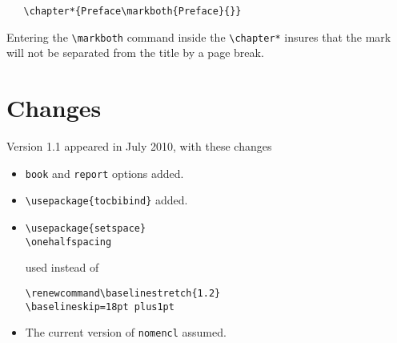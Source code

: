 \documentclass{article}
\begin{document}
\begin{itemize}
\begin{verbatim}
   \chapter*{Preface\markboth{Preface}{}}
\end{verbatim}
      Entering the \verb|\markboth| command inside the \verb|\chapter*| insures that the mark will not be separated from the title by a page break.
\end{itemize}

\section{Changes}
Version 1.1 appeared in July 2010, with these changes 
\begin{itemize}
\item \texttt{book} and \texttt{report} options added.

\item \verb|\usepackage{tocbibind}| added.

\item
\begin{verbatim}
\usepackage{setspace}
\onehalfspacing
\end{verbatim}
used instead of 
\begin{verbatim}
\renewcommand\baselinestretch{1.2}
\baselineskip=18pt plus1pt
\end{verbatim}

\item The current version of \texttt{nomencl} assumed.
\end{itemize}
\end{document}
